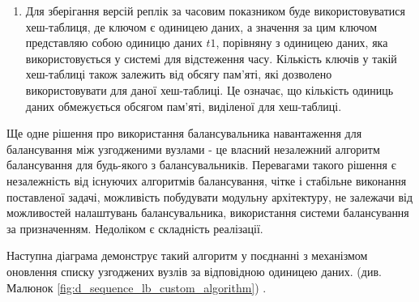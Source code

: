 \documentclass[14pt]{vakthesis}
\begin{document}
\begin{enumerate}
\item Для зберігання версій реплік за часовим показником буде використовуватися хеш-таблиця, де ключом є одиницею даних, а значення за цим ключом представляю собою одиницю даних $t1$, порівняну з одиницею даних, яка використовується у системі для відстеження часу. Кількість ключів у такій хеш-таблиці також залежить від обсягу пам'яті, які дозволено використовувати для даної хеш-таблиці. Це означає, що кількість одиниць даних обмежується обсягом пам'яті, виділеної для хеш-таблиці.

\end{enumerate}

Ще одне рішення про використання балансувальника навантаження для балансування між узгодженими вузлами - це власний незалежний алгоритм балансування для будь-якого з балансувальників. Перевагами такого рішення є незалежність від існуючих алгоритмів балансування, чітке і стабільне виконання поставленої задачі, можливість побудувати модульну архітектуру, не залежачи від можливостей налаштувань балансувальника, використання системи балансування за призначенням.
Недоліком є складність реалізації.

Наступна діаграма демонструє такий алгоритм у поєднанні з механізмом оновлення списку узгоджених вузлів за відповідною одиницею даних. (див. Малюнок \ref{fig:d_sequence_lb_custom_algorithm}) .
\end{document}
